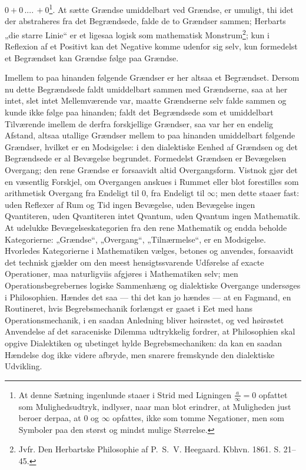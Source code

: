 \documentclass[12pt,a4paper]{book}
\begin{document}
$0 + 0\,....\,+ 0$\footnote{At denne Sætning ingenlunde staaer
i Strid med Ligningen $\frac{a}{\infty} = 0$ opfattet som
Mulighedsudtryk, indlyser, naar man blot erindrer, at Muligheden just
beroer derpaa, at $0$ og $\infty$ opfattes, ikke som tomme Negationer,
men som Symboler paa den størst og mindst mulige Størrelse.}.
At sætte Grændse umiddelbart ved
Grændse, er umuligt, thi idet der abstraheres fra det Begrændsede,
falde de to Grændser sammen; Herbarts „die
starre Linie“ er et ligesaa logisk som mathematisk
Monstrum\footnote{Jvfr. Den Herbartske Philosophie af P.~S.~V.
Heegaard. Kbhvn. 1861. S. 21--45.};
kun i Reflexion af et Positivt kan det Negative komme udenfor
sig selv, kun formedelst et Begrændset kan Grændse følge
paa Grændse.

Imellem to paa hinanden følgende Grændser er her
altsaa et Begrændset. Dersom nu dette Begrændsede faldt
umiddelbart sammen med Grændserne, saa at her intet, slet
intet Mellemværende var, maatte Grændserne selv falde sammen
og kunde ikke følge paa hinanden; faldt det Begrændsede som
et umiddelbart Tilværende imellem de derfra forskjellige
Grændser, saa var her en endelig Afstand, altsaa utallige
Grændser mellem to paa hinanden umiddelbart følgende
Grændser, hvilket er en Modsigelse: i den dialektiske Eenhed
af Grændsen og det Begrændsede er al Bevægelse begrundet.
Formedelst Grændsen er Bevægelsen Overgang; den rene
Grændse er forsaavidt altid Overgangsform. Vistnok gjør
det en væsentlig Forskjel, om Overgangen anskues i Rummet
eller blot forestilles som arithmetisk Overgang fra Endeligt
til $0$, fra Endeligt til $\infty$; men dette staaer fast: uden
Reflexer af Rum og Tid ingen Bevægelse, uden Bevægelse
ingen Qvantiteren, uden Qvantiteren intet Qvantum, uden
Qvantum ingen Mathematik. At udelukke Bevægelseskategorien
fra den rene Mathematik og endda beholde Kategorierne:
„Grændse“, „Overgang“, „Tilnærmelse“, er en Modsigelse.
Hvorledes Kategorierne i Mathematiken vælges, betones og
anvendes, forsaavidt det technisk gjælder om den meest hensigtssvarende
Udførelse af exacte Operationer, maa naturligviis
afgjøres i Mathematiken selv; men Operationsbegrebernes
logiske Sammenhæng og dialektiske Overgange undersøges i
Philosophien. Hændes det saa --- thi det kan jo hændes ---
at en Fagmand, en Routineret, hvis Begrebsmechanik forlængst
er gaaet i Eet med hans Operationsmechanik, i en
saadan Anledning bliver høirøstet, og ved høirøstet Anvendelse
af det saraceniske Dilemma udtrykkelig fordrer, at Philosophien
skal opgive Dialektiken og ubetinget hylde Begrebsmechaniken:
da kan en saadan Hændelse dog ikke videre afbryde,
men snarere fremskynde den dialektiske Udvikling.
\end{document}
